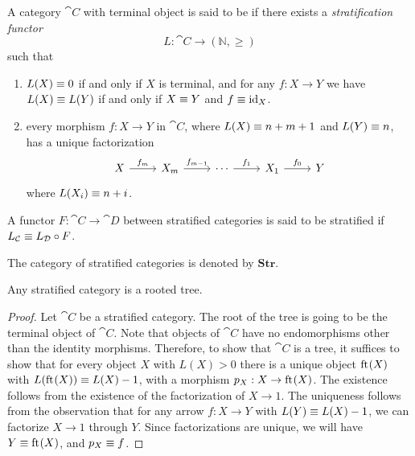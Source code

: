 \begin{defn}
A category $\cat{C}$ with terminal object is said to be  if there exists a 
\emph{stratification functor}
\begin{equation*}
L : \cat{C}\to (\mathbb{N},\geq)
\end{equation*}
such that
\begin{enumerate}
\item $L(X)\equiv 0$ if and only if $X$ is terminal, and for any $f:X\to Y$ we have
$L(X)\equiv L(Y)$ if and only if $X\equiv Y$ and $f\equiv{\mathrm{id}_{X}}$. 
\item every morphism $f:X\to Y$ in $\cat{C}$, where $L(X)\equiv
n+m+1$ and $L(Y)\equiv n$, has a unique factorization 
\begin{equation*}
\begin{tikzcd}
X \arrow[r,"f_m"] & X_m \arrow[r,"f_{m-1}"] & \cdots \arrow[r,"f_1"] & X_1 \arrow[r,"f_0"] & Y
\end{tikzcd}
\end{equation*}
where $L(X_i)\equiv n+i$.
\end{enumerate}
A functor $F:\cat{C}\to\cat{D}$ between stratified categories is said to be stratified 
if $L_{\mathcal{C}}\equiv L_{\mathcal{D}}\circ F$.

The category of stratified categories is denoted by $\mathbf{Str}$.
\end{defn}


\begin{lem}
Any stratified category is a rooted tree.
\end{lem}

\begin{proof}
Let $\cat{C}$ be a stratified category. The root of the tree is going to be the terminal
object of $\cat{C}$. Note that objects of $\cat{C}$ have no endomorphisms other
than the identity morphisms. Therefore, to show that $\cat{C}$ is a tree,
it suffices to show that for every object $X$ with $L(X)>0$ there is
a unique object $\mathrm{ft}_{}(X)$ with $L(\mathrm{ft}_{}(X))\equiv L(X)-1$, with a morphism $p_X:X\to \mathrm{ft}_{}(X)$.
The existence follows from the existence of the factorization of $X\to 1$. The 
uniqueness follows from the observation that for any arrow
$f:X\to Y$ with $L(Y)\equiv L(X)-1$, we can factorize $X\to 1$ through $Y$. Since
factorizations are unique, we will have $Y\equiv \mathrm{ft}_{}(X)$, and $p_X\equiv f$. 
\end{proof}

